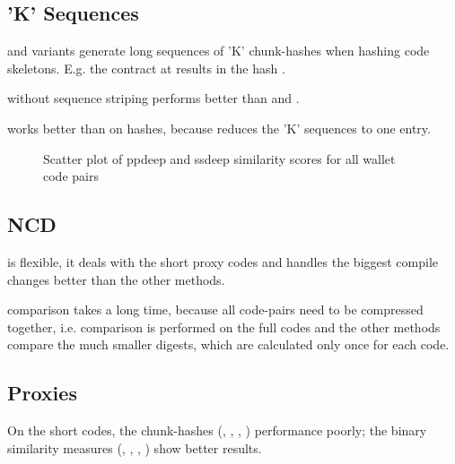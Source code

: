\documentclass[../main.tex]{subfiles}
\begin{document}
\subsection{'K' Sequences}
\begin{obs}
   and variants generate long sequences of 'K' chunk-hashes when hashing code skeletons.
  E.g. the contract  at  results in the hash .
\end{obs}
\begin{res}
   without sequence striping performs better than  and  .
\end{res}
\begin{res}
   works better than  on  hashes, because  reduces the 'K' sequences to one entry.
\end{res}


\begin{figure}[ht!]
  \centering
  \caption{Scatter plot of ppdeep and ssdeep similarity scores for all wallet code pairs}
  \label{fig:ssppScat}
\end{figure}

\subsection{NCD}
\begin{hyp}
   is flexible, it deals with the short proxy codes and handles the biggest compile changes better than the other methods.
\end{hyp}
\begin{res}
   comparison takes a long time, because all code-pairs need to be compressed together, i.e.  comparison is performed on the full codes and the other methods compare the much smaller digests, which are calculated only once for each code.
\end{res}

\subsection{Proxies}
\begin{res}
  On the short  codes, the chunk-hashes (, , , ) performance poorly; the binary similarity measures (, , , ) show better results.
\end{res}
\end{document}
